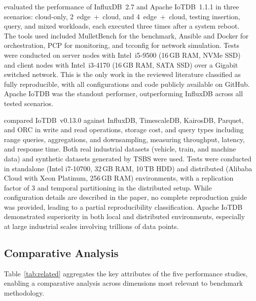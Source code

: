 \cite{pereira2023mulletbench} evaluated the performance of InfluxDB~2.7 and Apache IoTDB~1.1.1
in three scenarios: cloud-only, 2~edge~+~cloud, and 4~edge~+~cloud, testing insertion,
query, and mixed workloads, each executed three times after a system reboot. The tools used
included MulletBench for the benchmark, Ansible and Docker for orchestration, PCP for
monitoring, and tcconfig for network simulation. Tests were conducted on server nodes with
Intel~i5-9500 (16\,GB RAM, NVMe SSD) and client nodes with Intel~i3-4170 (16\,GB RAM,
SATA SSD) over a Gigabit switched network. This is the only work in the reviewed literature
classified as fully reproducible, with all configurations and code publicly available on GitHub.
Apache IoTDB was the standout performer, outperforming InfluxDB across all tested scenarios.

\cite{wang2023iotdb} compared IoTDB~v0.13.0 against InfluxDB, TimescaleDB, KairosDB, Parquet,
and ORC in write and read operations, storage cost, and query types including range queries,
aggregations, and downsampling, measuring throughput, latency, and response time.
Both real industrial datasets (vehicle, train, and machine data) and synthetic datasets
generated by TSBS were used. Tests were conducted in standalone (Intel i7-10700, 32\,GB RAM,
10\,TB HDD) and distributed (Alibaba Cloud with Xeon Platinum, 256\,GB RAM) environments,
with a replication factor of 3 and temporal partitioning in the distributed setup. While
configuration details are described in the paper, no complete reproduction guide was provided,
leading to a partial reproducibility classification. Apache IoTDB demonstrated superiority
in both local and distributed environments, especially at large industrial scales involving
trillions of data points.

\subsection{Comparative Analysis}

Table~\ref{tab:related} aggregates the key attributes of the five performance studies, enabling
a comparative analysis across dimensions most relevant to benchmark methodology.

